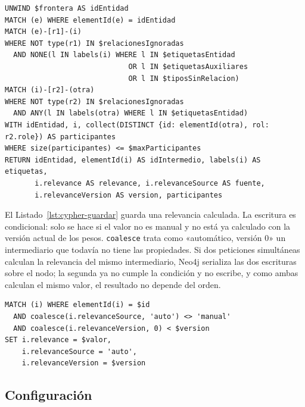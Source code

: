 \begin{lstlisting}[style=codigo, caption={Consulta prevista: intermediarios de la frontera de un nivel.}, label={lst:cypher-vecindario}]
UNWIND $frontera AS idEntidad
MATCH (e) WHERE elementId(e) = idEntidad
MATCH (e)-[r1]-(i)
WHERE NOT type(r1) IN $relacionesIgnoradas
  AND NONE(l IN labels(i) WHERE l IN $etiquetasEntidad
                             OR l IN $etiquetasAuxiliares
                             OR l IN $tiposSinRelacion)
MATCH (i)-[r2]-(otra)
WHERE NOT type(r2) IN $relacionesIgnoradas
  AND ANY(l IN labels(otra) WHERE l IN $etiquetasEntidad)
WITH idEntidad, i, collect(DISTINCT {id: elementId(otra), rol: r2.role}) AS participantes
WHERE size(participantes) <= $maxParticipantes
RETURN idEntidad, elementId(i) AS idIntermedio, labels(i) AS etiquetas,
       i.relevance AS relevance, i.relevanceSource AS fuente,
       i.relevanceVersion AS version, participantes
\end{lstlisting}


El Listado~\ref{lst:cypher-guardar} guarda una relevancia calculada. La escritura es condicional: solo se hace si el valor no es manual y no está ya calculado con la versión actual de los pesos. \texttt{coalesce} trata como «automático, versión 0» un intermediario que todavía no tiene las propiedades. Si dos peticiones simultáneas calculan la relevancia del mismo intermediario, Neo4j serializa las dos escrituras sobre el nodo; la segunda ya no cumple la condición y no escribe, y como ambas calculan el mismo valor, el resultado no depende del orden.

\begin{lstlisting}[style=codigo, caption={Consulta prevista: guardar la relevancia sin pisar un valor manual.}, label={lst:cypher-guardar}]
MATCH (i) WHERE elementId(i) = $id
  AND coalesce(i.relevanceSource, 'auto') <> 'manual'
  AND coalesce(i.relevanceVersion, 0) < $version
SET i.relevance = $valor,
    i.relevanceSource = 'auto',
    i.relevanceVersion = $version
\end{lstlisting}


\subsection{Configuración}

